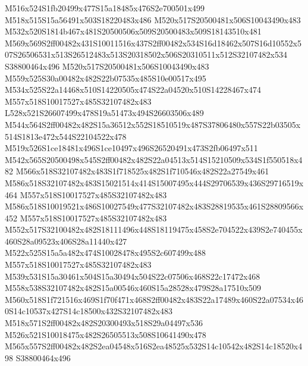 \documentclass{article}
\begin{document}
\begin{multicols}{2}





M516x524S1fb20499x477S15a18485x476S2e700501x499 M518x515S15a56491x503S18220483x486 M520x517S20500481x506S10043490x483 M532x520S1814b467x481S20500506x509S20500483x509S18143510x481 M569x569S2ff00482x431S10011516x437S2ff00482x534S16d18462x507S16d10552x507S26506531x513S26512483x513S20318502x506S20310511x512S32107482x534 S38800464x496 M520x517S20500481x506S10043490x483 M559x525S30a00482x482S22b07535x485S10e00517x495 M534x525S22a14468x510S14220505x474S22a04520x510S14228467x474 M557x518S10017527x485S32107482x483 L528x521S26607499x478S19a51473x494S26603506x489 M544x564S2ff00482x482S15a36512x552S18510519x487S37806480x557S22b03505x514S1813e472x544S22104522x478 M519x526S1ce18481x496S1ce10497x496S26520491x473S2fb06497x511 M542x565S20500498x545S2ff00482x482S22a04513x514S15210509x534S1f550518x482 M566x518S32107482x483S1f718525x482S1f710546x482S22a27549x461 M586x518S32107482x483S15021514x414S15007495x444S29706539x436S29716519x464 M557x518S10017527x485S32107482x483 M586x518S10019521x486S10027549x477S32107482x483S28819535x461S28809566x452 M557x518S10017527x485S32107482x483 M552x517S32100482x482S18111496x448S18119475x458S2e704522x439S2e740455x460S28a09523x406S28a11440x427 M522x525S15a5a482x474S10028478x495S2c607499x488 M557x518S10017527x485S32107482x483 M539x531S15a30461x504S15a30494x504S22c07506x468S22c17472x468 M558x538S32107482x482S15a00546x460S15a28528x479S28a17510x509 M560x518S1f721516x469S1f70f471x468S2ff00482x483S22a17489x460S22a07534x460S14c10537x427S14c18500x432S32107482x483 M518x571S2ff00482x482S20300493x518S29a04497x536 M526x521S10018475x482S26505513x508S10641490x478 M565x557S2ff00482x482S2ea04548x516S2ea48525x532S14c10542x482S14c18520x498 S38800464x496


\end{multicols}
\end{document}
